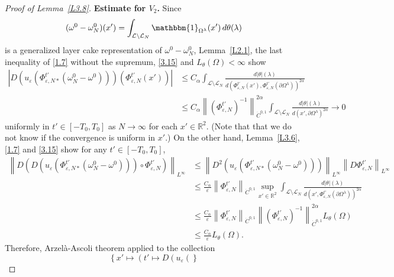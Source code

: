 \documentclass[reqno,centertags,12pt]{amsart}
\theoremstyle{definition}
\numberwithin{equation}{section}
\newcommand{\abs}[1]{\left\lvert#1\right\rvert}
\newcommand{\norm}[1]{\left\|#1\right\|}
\newcommand{\set}[1]{\left\{ #1 \right\}}
\newcommand{\bbR}{{\mathbb{R}}}
\newcommand{\eps}{\varepsilon}
\newcommand{\tht}{\theta}
\begin{document}
\begin{proof}[Proof of Lemma~\ref{L3.8}]
    \textbf{Estimate for $V_{2}$.} Since
    \[
        (\omega^{0} - \omega_{N}^{0})(x')
        = \int_{\mathcal{L}\setminus\mathcal{L}_{N}}
        \mathbbm{1}_{\Omega^{\lambda}}(x')\,d\theta(\lambda)
    \]
    is a generalized layer cake representation of $\omega^{0} - \omega_{N}^{0}$,
    Lemma~\ref{L2.1}, the last inequality of \eqref{1.7} without the supremum,
    \eqref{3.15} and $L_{\theta}(\Omega)<\infty$ show
    \begin{align*}
        \abs{D\left(u_{\eps}\left(
            \Phi_{\eps,N*}^{t'}(\omega_{N}^{0} - \omega^{0})
        \right)\right)(\Phi_{\eps,N}^{t'}(x'))}
        &\leq C_{\alpha}\int_{\mathcal{L}\setminus\mathcal{L}_{N}}
        \frac{d|\theta|(\lambda)}
        {d(\Phi_{\eps,N}^{t'}(x'), \Phi_{\eps,N}^{t'}(\partial\Omega^{\lambda}))^{2\alpha}} \\
        &\leq C_{\alpha}\norm{(\Phi_{\eps,N}^{t'})^{-1}}_{\dot{C}^{0,1}}^{2\alpha}
        \int_{\mathcal{L}\setminus\mathcal{L}_{N}}
        \frac{d|\theta|(\lambda)}
        {d(x',\partial\Omega^{\lambda})^{2\alpha}} \to 0
    \end{align*}
    uniformly in $t'\in[-T_{0},T_{0}]$ as $N\to\infty$ for each $x'\in\bbR^{2}$.
    (Note that that we do not know if the convergence is uniform in $x'$.)
    On the other hand, Lemma~\ref{L3.6}, \eqref{1.7} and \eqref{3.15} show
    for any $t'\in[-T_{0},T_{0}]$,
    \begin{align*}
        \norm{D\left(D\left(u_{\eps}\left(
            \Phi_{\eps,N*}^{t'}(\omega_{N}^{0} - \omega^{0})
        \right)\right)\circ \Phi_{\eps,N}^{t'}\right)}_{L^{\infty}}
        &\leq \norm{D^{2}\left(u_{\eps}\left(
            \Phi_{\eps,N*}^{t'}(\omega_{N}^{0} - \omega^{0})
        \right)\right)}_{L^{\infty}}\norm{D\Phi_{\eps,N}^{t'}}_{L^{\infty}} \\
        &\leq \frac{C_{\alpha}}{\eps}\norm{\Phi_{\eps,N}^{t'}}_{\dot{C}^{0,1}}
        \sup_{x'\in\bbR^{2}}\int_{\mathcal{L}\setminus\mathcal{L}_{N}}
        \frac{d|\theta|(\lambda)}{d(x',\Phi_{\eps,N}^{t'}(\partial\Omega^{\lambda}))^{2\alpha}} \\
        &\leq \frac{C_{\alpha}}{\eps}\norm{\Phi_{\eps,N}^{t'}}_{\dot{C}^{0,1}}
        \norm{(\Phi_{\eps,N}^{t'})^{-1}}_{\dot{C}^{0,1}}^{2\alpha}L_{\tht}(\Omega) \\
        &\leq \frac{C_{\alpha}}{\eps}L_{\tht}(\Omega).
    \end{align*}
    Therefore, Arzel\`{a}-Ascoli theorem applied to the collection
    \[
        \set{x'\mapsto \left(
            t'\mapsto D\left(u_{\eps}\left(
}\]
\end{proof}
\end{document}
